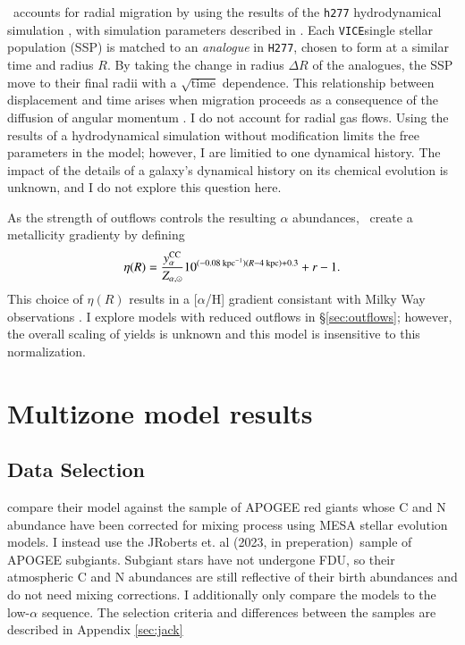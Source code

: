 \documentclass[12pt,oneside]{report}
\newcommand{\JJ}{\citetalias{james+21}}
\newcommand{\VICE}{\texttt{VICE}}
\newcommand{\citetjack}{JRoberts et. al (2023, in preperation)}
\begin{document}
\JJ\ accounts for radial migration by using the results of the \texttt{h277} hydrodynamical simulation \citep{christensen12, zolotov12, loebman12, BZ14}, with simulation parameters described in \citet{bird+21}. Each \VICE single stellar population (SSP) is matched to an \textit{analogue} in \texttt{H277}, chosen to form at a similar time and radius $R$. By taking the change in radius $\Delta R$ of the analogues, the SSP move to their final radii with a $\sqrt{\text{time}}$ dependence.
This relationship between displacement and time arises when migration proceeds as a consequence of the diffusion of angular momentum \citep{frankel18, frankel20}.
I do not account for radial gas flows.
Using the results of a hydrodynamical simulation without modification limits the free parameters in the model; however, I are limitied to one dynamical history. The impact of the details of a galaxy's dynamical history on its chemical evolution is unknown, and I do not explore this question here.

As the strength of outflows controls the resulting $\alpha$ abundances, \JJ~create a metallicity gradienty by defining
\begin{equation}
\eta(R) = \frac{y_{\alpha}^{\rm CC}}{Z_{\alpha, \odot}} 10^{(-0.08\text{ kpc}^{-1})(R-4\text{ kpc})+0.3} + r - 1.
\end{equation}
This choice of $\eta(R)$ results in a [$\alpha$/H] gradient consistant with Milky Way observations \citep{james+21}. I explore models with reduced outflows in \S\ref{sec:outflows}; however, the overall scaling of yields is unknown and this model is insensitive to this normalization.


\chapter{Multizone model results}
\section{Data Selection}

\citet{james+22} compare their model against the \cite{fiorenzo+21} sample of APOGEE \citet{apogee17} red giants whose C and N abundance have been corrected for mixing process using MESA stellar evolution models. 
I instead use the \citetjack~sample of APOGEE subgiants. Subgiant stars have not undergone FDU, so their atmospheric C and N abundances are still reflective of their birth abundances and do not need mixing corrections. I additionally only compare the models to the low-$\alpha$ sequence.  The selection criteria and differences between the samples are described in Appendix \ref{sec:jack}
\end{document}
